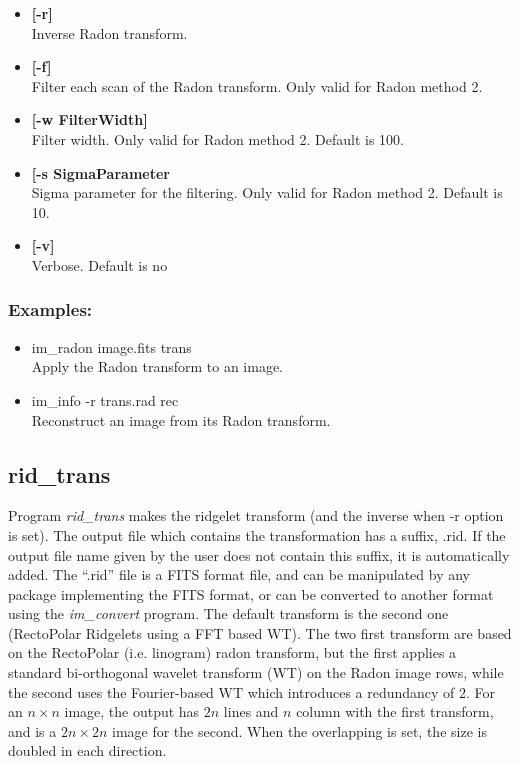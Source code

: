 \begin{itemize}
\item {\bf [-r]} \\
Inverse Radon transform.
\item {\bf [-f]} \\
Filter each scan of the Radon transform. Only valid for Radon
method 2.
\item {\bf [-w FilterWidth]} \\
Filter width. Only valid for Radon
method 2. Default is 100. 
\item {\bf [-s SigmaParameter} \\
 Sigma parameter for the filtering. Only valid for Radon
method 2. Default is 10.
\item {\bf [-v]} \\
Verbose. Default is no
\end{itemize}

\subsubsection*{Examples:}
\begin{itemize}
\item im\_radon image.fits trans\\
Apply the Radon transform to an image.
\item im\_info -r trans.rad rec\\
 Reconstruct an image from its Radon transform.
\end{itemize}

\subsection{rid\_trans}
Program {\em rid\_trans} makes the  ridgelet transform 
(and the inverse when -r option is set).  
The output file which contains the transformation has a 
suffix, .rid. If the output file name
given by the user does not contain this suffix, it is automatically
added. The ``.rid'' file is a FITS format file, and can be manipulated by
any package implementing the FITS format, or can be converted to another
format using the {\em im\_convert} program.
The default transform is the second one 
(RectoPolar Ridgelets using a  FFT based WT). 
The two first transform are based on the RectoPolar
(i.e. linogram) radon transform, but the first applies a standard 
bi-orthogonal wavelet transform (WT) on the Radon image rows, while the
second uses the Fourier-based WT which introduces a redundancy of 2.
For an $n \times n$ image, the output has $2n$ lines and $n$ column 
with the first transform, and is a $2n \times 2n$ image for the second.
When the overlapping is set, the size is doubled in each direction.

